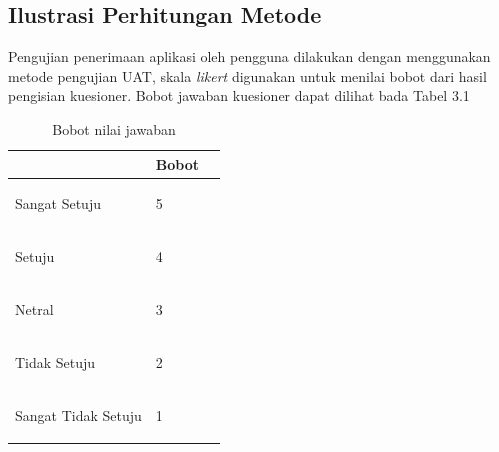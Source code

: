 \begin{flushleft}
\begin{justify}
      \section{Ilustrasi Perhitungan Metode}
      Pengujian penerimaan aplikasi oleh pengguna dilakukan dengan menggunakan metode pengujian UAT, skala 
      \emph{likert} digunakan untuk menilai bobot dari hasil pengisian kuesioner. Bobot jawaban kuesioner \cite{kuantitatif}
      dapat dilihat bada Tabel 3.1
      \begin{table}[ht]
         \centering
         \caption{Bobot nilai jawaban}
         \begin{tabular}{|>{\raggedright}p{5cm}|p{2.5cm}|>{\raggedright}p{5cm}|}
          \hline
          \multicolumn{1}{|c}{\bfseries Jawaban} & \multicolumn{1}{|c|}{\bfseries Bobot} \\ 
           \hline
         \begin{center}
            Sangat Setuju
         \end{center} &
            \begin{center}
               5
            \end{center}
              \tabularnewline
              \hline
         \begin{center}
            Setuju
         \end{center} &
               \begin{center}
                 4
            \end{center}
             \tabularnewline
           \hline
         \begin{center}
            Netral
         \end{center} &
               \begin{center}
                 3
            \end{center}
             \tabularnewline
           \hline
         \begin{center}
            Tidak Setuju
         \end{center} &
               \begin{center}
                2
            \end{center}
             \tabularnewline
           \hline
         \begin{center}
            Sangat Tidak Setuju
         \end{center} &
               \begin{center}
                1
            \end{center}

\end{tabular}
\end{table}
\end{justify}
\end{flushleft}
